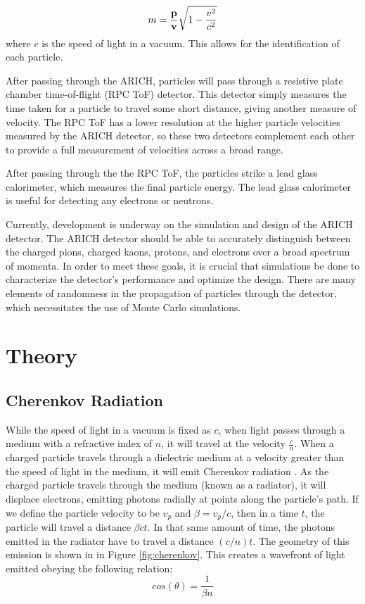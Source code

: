 \begin{equation}
    \label{eq:relMass}
    m = \frac{\bf{p}}{\bf{v}}\sqrt{1-\frac{v^2}{c^2}}
\end{equation}
where $c$ is the speed of light in a vacuum. This allows for the identification of each particle.

After passing through the ARICH, particles will pass through a resistive plate chamber time-of-flight (RPC ToF) detector. This detector simply measures the time taken for a particle to travel some short distance, giving another measure of velocity. The RPC ToF has a lower resolution at the higher particle velocities measured by the ARICH detector, so these two detectors complement each other to provide a full measurement of velocities across a broad range.

After passing through the the RPC ToF, the particles strike a lead glass calorimeter, which measures the final particle energy. The lead glass calorimeter is useful for detecting any electrons or neutrons.

Currently, development is underway on the simulation and design of the ARICH detector. The ARICH detector should be able to accurately distinguish between the charged pions, charged kaons, protons, and electrons over a broad spectrum of momenta. In order to meet these goals, it is crucial that simulations be done to characterize the detector's performance and optimize the design. There are many elements of randomness in the propagation of particles through the detector, which necessitates the use of Monte Carlo simulations. 


\section{Theory}
\subsection{Cherenkov Radiation}
While the speed of light in a vacuum is fixed as $c$, when light passes through a medium with a refractive index of $n$, it will travel at the velocity $\frac{c}{n}$. When a charged particle travels through a dielectric medium at a velocity greater than the speed of light in the medium, it will emit Cherenkov radiation \cite{cherenkov}. As the charged particle travels through the medium (known as a radiator), it will displace electrons, emitting photons radially at points along the particle's path. If we define the particle velocity to be $v_p$ and $\beta = v_p / c$, then in a time $t$, the particle will travel a distance $\beta ct$. In that same amount of time, the photons emitted in the radiator have to travel a distance $(c/n)t$. The geometry of this emission is shown in in Figure \ref{fig:cherenkov}. This creates a wavefront of light emitted obeying the following relation:
\begin{equation}
    cos(\theta) = \frac{1}{\beta n}
    \label{eq:cherenkovAngle}
\end{equation}

